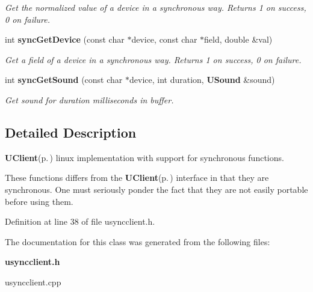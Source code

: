 \begin{CompactItemize}
\begin{CompactList}\small\item\em Get the normalized value of a device in a synchronous way. Returns 1 on success, 0 on failure. \item\end{CompactList}\item 
int {\bf sync\-Get\-Device} (const char $\ast$device, const char $\ast$field, double \&val)\label{classUSyncClient_a6}

\begin{CompactList}\small\item\em Get a field of a device in a synchronous way. Returns 1 on success, 0 on failure. \item\end{CompactList}\item 
int {\bf sync\-Get\-Sound} (const char $\ast$device, int duration, {\bf USound} \&sound)\label{classUSyncClient_a7}

\begin{CompactList}\small\item\em Get sound for duration milliseconds in buffer. \item\end{CompactList}\end{CompactItemize}


\subsection{Detailed Description}
{\bf UClient}{\rm (p.\,\pageref{classUClient})} linux implementation with support for synchronous functions. 

These functions differs from the {\bf UClient}{\rm (p.\,\pageref{classUClient})} interface in that they are synchronous. One must seriously ponder the fact that they are not easily portable before using them. 



Definition at line 38 of file usyncclient.h.

The documentation for this class was generated from the following files:\begin{CompactItemize}
\item 
{\bf usyncclient.h}\item 
usyncclient.cpp\end{CompactItemize}
